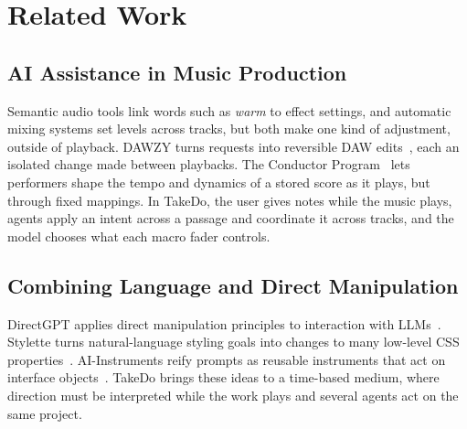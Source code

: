 \documentclass[sigconf,nonacm]{acmart}
\newcommand{\projectname}{TakeDo}
\begin{document}
\section{Related Work}

\subsection{AI Assistance in Music Production}

Semantic audio tools link words such as \emph{warm} to effect settings, and automatic mixing systems set levels across tracks, but both make one kind of adjustment, outside of playback. DAWZY turns requests into reversible DAW edits~\cite{elkins2025dawzy}, each an isolated change made between playbacks. The Conductor Program~\cite{mathews1991radio} lets performers shape the tempo and dynamics of a stored score as it plays, but through fixed mappings. In \projectname{}, the user gives notes while the music plays, agents apply an intent across a passage and coordinate it across tracks, and the model chooses what each macro fader controls.

\subsection{Combining Language and Direct Manipulation}

DirectGPT applies direct manipulation principles to interaction with LLMs~\cite{masson2024directgpt}. Stylette turns natural-language styling goals into changes to many low-level CSS properties~\cite{kim2022stylette}. AI-Instruments reify prompts as reusable instruments that act on interface objects~\cite{riche2025aiinstruments}. \projectname{} brings these ideas to a time-based medium, where direction must be interpreted while the work plays and several agents act on the same project.



\end{document}
